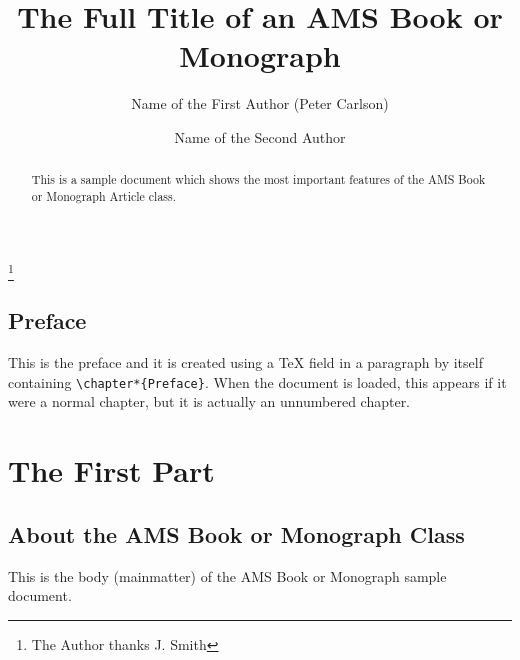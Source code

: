 \documentclass{amsbook}%
\theoremstyle{plain}
\numberwithin{equation}{section}
\begin{document}
\frontmatter
\title[Short Title]{The Full Title of an AMS Book or Monograph}
\author[P. Carlson]{Name of the First Author (Peter Carlson)}
\address[P. Carlson]{Author One address, line 1%
\hspace*{\fill}\linebreak\indent%
Author One address, line 2}%
%
\author{Name of the Second Author}
\thanks{The Author thanks J. Smith}

\begin{abstract}
This is a sample document which shows the most important features
of the AMS Book or Monograph Article class.
\end{abstract}
\maketitle
\tableofcontents


\chapter*{Preface}

 This is the preface and it is created
using a TeX field in a paragraph by itself containing
\verb|\chapter*{Preface}|. When the document is loaded, this
appears if it were a normal chapter, but it is actually an
unnumbered chapter.

\mainmatter

\part{The First Part}

\chapter{About the AMS Book or Monograph Class}

This is the body (mainmatter) of the AMS Book or Monograph sample
document.
\end{document}
